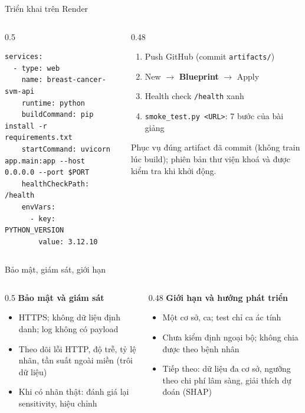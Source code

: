 \documentclass[aspectratio=169,12pt]{beamer}
\begin{document}
\begin{frame}[fragile]{Triển khai trên Render}
  \begin{columns}[T]
    \begin{column}{0.5\textwidth}
\begin{lstlisting}
services:
  - type: web
    name: breast-cancer-svm-api
    runtime: python
    buildCommand: pip install -r requirements.txt
    startCommand: uvicorn app.main:app --host 0.0.0.0 --port $PORT
    healthCheckPath: /health
    envVars:
      - key: PYTHON_VERSION
        value: 3.12.10
\end{lstlisting}
    \end{column}
    \begin{column}{0.48\textwidth}
      \small
      \begin{enumerate}
        \item Push GitHub (commit \texttt{artifacts/})
        \item New $\rightarrow$ \textbf{Blueprint} $\rightarrow$ Apply
        \item Health check \texttt{/health} xanh
        \item \texttt{smoke\_test.py <URL>}: 7 bước của bài giảng
      \end{enumerate}
      Phục vụ \alert{đúng artifact đã commit} (không train lúc build); phiên bản thư viện khoá và được kiểm tra khi khởi động.
    \end{column}
  \end{columns}
\end{frame}

\begin{frame}{Bảo mật, giám sát, giới hạn}
  \begin{columns}[T]
    \begin{column}{0.5\textwidth}
      \textbf{Bảo mật và giám sát}
      \small
      \begin{itemize}
        \item HTTPS; không dữ liệu định danh; log không có payload
        \item Theo dõi lỗi HTTP, độ trễ, tỷ lệ nhãn, tần suất ngoài miền (trôi dữ liệu)
        \item Khi có nhãn thật: đánh giá lại sensitivity, hiệu chỉnh
      \end{itemize}
    \end{column}
    \begin{column}{0.48\textwidth}
      \textbf{Giới hạn và hướng phát triển}
      \small
      \begin{itemize}
        \item Một cơ sở, \NSamples{} ca; test chỉ \TestMalignant{} ca ác tính
        \item Chưa kiểm định ngoại bộ; không chia được theo bệnh nhân
        \item Tiếp theo: dữ liệu đa cơ sở, ngưỡng theo chi phí lâm sàng, giải thích dự đoán (SHAP)
      \end{itemize}
    \end{column}
  \end{columns}
\end{frame}
\end{document}

